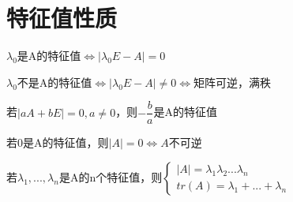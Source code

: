 \section{特征值性质}

\(\lambda_0\)是A的特征值\(\Leftrightarrow |\lambda_0E - A| = 0\)

\(\lambda_0\)不是A的特征值\(\Leftrightarrow |\lambda_0E - A| \neq 0 \Leftrightarrow\)矩阵可逆，满秩

若\(|aA + bE| = 0, a \neq 0\)，则\(-\dfrac{b}{a}\)是A的特征值

若0是A的特征值，则\(|A| = 0 \Leftrightarrow A\text{不可逆}\)

若\(\lambda_1, ..., \lambda_n\)是A的n个特征值，则\(\begin{cases}
|A| = \lambda_1\lambda_2...\lambda_n \\ 
tr(A) = \lambda_1 + ... + \lambda_n
\end{cases}\)

